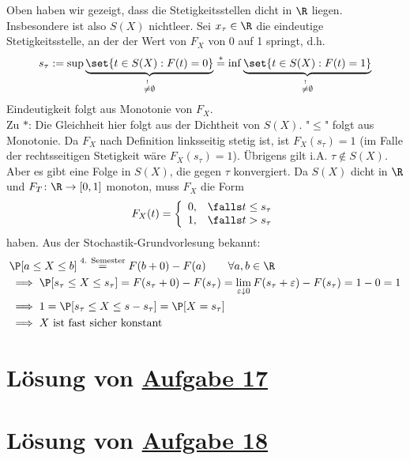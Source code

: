 Oben haben wir gezeigt, dass die Stetigkeitsstellen dicht in $\R$ liegen.
Insbesondere ist also $S(X)$ nichtleer.
Sei $x_\tau\in\R$ die eindeutige Stetigkeitsstelle, an der der Wert von $F_X$ von 0 auf 1 springt, d.h.
\begin{align*}
	s_\tau:=\sup\underbrace{\set{t\in S(X):F(t)=0}}_{
		\overset{!}{\neq}\emptyset
	}
	\overset{\ast}{=}
	\inf\underbrace{\set{t\in S(X):F(t)=1}}_{
		\overset{!}{\neq}\emptyset
	}
\end{align*}
Eindeutigkeit folgt aus Monotonie von $F_X$.\\
Zu $\ast$: Die Gleichheit hier folgt aus der Dichtheit von $S(X)$.
"$\leq$" folgt aus Monotonie.
Da $F_X$ nach Definition linksseitig stetig ist, ist $F_X(s_\tau)=1$ (im Falle der rechtsseitigen Stetigkeit wäre $F_X(s_\tau)=1$).
Übrigens gilt i.A. $\tau\not\in S(X)$.
Aber es gibt eine Folge in $S(X)$, die gegen $\tau$ konvergiert.
Da $S(X)$ dicht in $\R$ und $F_T\colon\R\to[0,1]$ monoton, muss $F_X$ die Form
\begin{align*}
	F_X(t)=\left\lbrace\begin{array}{cl}
		0, &\falls t\leq s_\tau\\
		1, &\falls t> s_\tau
	\end{array}\right.
\end{align*}
haben.
Aus der Stochastik-Grundvorlesung bekannt:
\begin{align*}
	&\P[a\leq X\leq b]
	\overset{\text{4. Semester}}{=}
	F(b+0)-F(a)\qquad\forall a,b\in\R\\
	&\implies
	\P[s_\tau\leq X\leq s_\tau]
	=
	F(s_\tau+0)-F(s_\tau)
	=\lim\limits_{\varepsilon\downarrow0} F(s_\tau+\varepsilon)-F(s_\tau)
	=1-0=1\\
	&\implies
	1=\P[s_\tau\leq X\leq s-s_\tau]=\P[X=s_\tau]\\
	&\implies
	X\text{ ist fast sicher konstant}
\end{align*}

\section{Lösung von 
	\texorpdfstring{\hyperref[aufg:17]{Aufgabe 17}}{}
}\label{loes:17}

\section{Lösung von 
	\texorpdfstring{\hyperref[aufg:18]{Aufgabe 18}}{}
}\label{loes:18}

